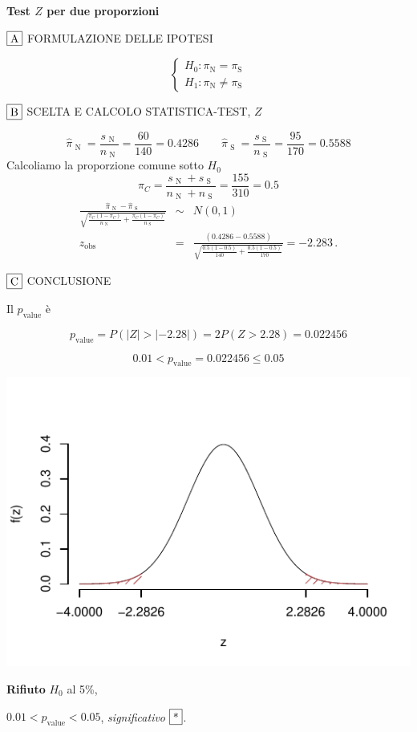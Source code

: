 \documentclass[
  11pt,
]{book}
\theoremstyle{mytheoremstyle}
\theoremstyle{mydefstyle}
\newenvironment{sol}
  {
  \begin{tcolorbox}[enhanced,breakable,arc=0.1mm,boxrule=1pt,colback=white,colframe=iblue,
  title=\bf \fontfamily{lmss}\selectfont \hspace{.5 cm} Soluzione,drop fuzzy shadow]

}{
\end{tcolorbox}
  }
\begin{document}
\begin{sol}
\textbf{Test \(Z\) per due proporzioni}

\(\fbox{A}\) FORMULAZIONE DELLE IPOTESI

\[\begin{cases}
   H_0: \pi_\text{N} = \pi_\text{S} \\
   H_1: \pi_\text{N} \neq \pi_\text{S} 
   \end{cases}\]

\(\fbox{B}\) SCELTA E CALCOLO STATISTICA-TEST, \(Z\)

\[\hat\pi_\text{ N }=\frac{s_\text{ N }}{n_\text{ N }}=\frac{ 60 }{ 140 }= 0.4286 \qquad
   \hat\pi_\text{ S }=\frac{s_\text{ S }}{n_\text{ S }}=\frac{ 95 }{ 170 }= 0.5588 \]Calcoliamo la proporzione comune sotto \(H_0\)
\[
     \pi_C=\frac{s_\text{ N }+s_\text{ S }}{n_\text{ N }+n_\text{ S }}=
     \frac{ 155 }{ 310 }= 0.5 
   \]\begin{eqnarray*}
   \frac{\hat\pi_\text{ N } - \hat\pi_\text{ S }}
   {\sqrt{\frac {\pi_C(1-\pi_C)}{n_\text{ N }}+\frac {\pi_C(1-\pi_C)}{n_\text{ S }}}}&\sim&N(0,1)\\
   z_{\text{obs}}
   &=& \frac{ ( 0.4286 -  0.5588 )} {\sqrt{\frac{ 0.5 (1- 0.5 )}{ 140 }+\frac{ 0.5 (1- 0.5 )}{ 170 }}}
   =   -2.283 \, .
   \end{eqnarray*}

\(\fbox{C}\) CONCLUSIONE

Il \(p_{\text{value}}\) è

\[ p_{\text{value}} = P(|Z|>|-2.28|)=2P(Z>2.28)=0.022456 \]

\[
 0.01 < p_\text{value}= 0.022456 \leq 0.05 
\]

\begin{center}\includegraphics{Esami_passati_con_soluzioni_files/figure-latex/2022-22-1} \end{center}

\textbf{Rifiuto} \(H_0\) al 5\%,

\(0.01<p_\text{value}<0.05\), \emph{significativo} \(\fbox{*}\).

\end{sol}
\end{document}
